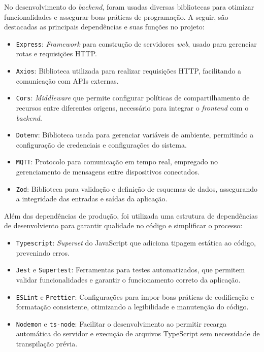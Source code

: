 No desenvolvimento do \textit{backend}, foram usadas diversas bibliotecas para otimizar funcionalidades e assegurar boas práticas de programação. A seguir, são destacadas as principais dependências e suas funções no projeto:

\begin{itemize}
    \item \texttt{Express}: \textit{Framework} para construção de servidores \textit{web}, usado para gerenciar rotas e requisições HTTP.
    \item \texttt{Axios}: Biblioteca utilizada para realizar requisições HTTP, facilitando a comunicação com APIs externas.
    \item \texttt{Cors}: \textit{Middleware} que permite configurar políticas de compartilhamento de recursos entre diferentes origens, necessário para integrar o \textit{frontend} com o \textit{backend}.
    \item \texttt{Dotenv}: Biblioteca usada para gerenciar variáveis de ambiente, permitindo a configuração de credenciais e configurações do sistema.
    \item \texttt{MQTT}: Protocolo para comunicação em tempo real, empregado no gerenciamento de mensagens entre dispositivos conectados.
    \item \texttt{Zod}: Biblioteca para validação e definição de esquemas de dados, assegurando a integridade das entradas e saídas da aplicação.
\end{itemize}

Além das dependências de produção, foi utilizada uma estrutura de dependências de desenvolviento para garantir qualidade no código e simplificar o processo:

\begin{itemize}
    \item \texttt{Typescript}: \textit{Superset} do JavaScript que adiciona tipagem estática ao código, prevenindo erros.
    \item \texttt{Jest} e \texttt{Supertest}: Ferramentas para testes automatizados, que permitem validar funcionalidades e garantir o funcionamento correto da aplicação.
    \item \texttt{ESLint} e \texttt{Prettier}: Configurações para impor boas práticas de codificação e formatação consistente, otimizando a legibilidade e manutenção do código.
    \item \texttt{Nodemon} e \texttt{ts-node}: Facilitar o desenvolvimento ao permitir recarga automática do servidor e execução de arquivos TypeScript sem necessidade de transpilação prévia.
\end{itemize}

